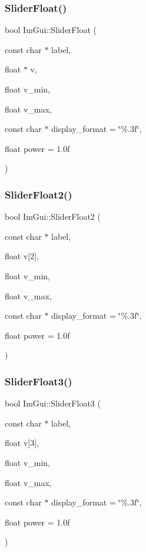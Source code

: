 \subsubsection{\texorpdfstring{Slider\+Float()}{SliderFloat()}}
{\footnotesize\ttfamily bool Im\+Gui\+::\+Slider\+Float (\begin{DoxyParamCaption}\item[{const char $\ast$}]{label,  }\item[{float $\ast$}]{v,  }\item[{float}]{v\+\_\+min,  }\item[{float}]{v\+\_\+max,  }\item[{const char $\ast$}]{display\+\_\+format = {\ttfamily \char`\"{}\%.3f\char`\"{}},  }\item[{float}]{power = {\ttfamily 1.0f} }\end{DoxyParamCaption})}

\hypertarget{namespace_im_gui_a0d5270d08284202523130e8b6ef66350}{}\label{namespace_im_gui_a0d5270d08284202523130e8b6ef66350} 
\subsubsection{\texorpdfstring{Slider\+Float2()}{SliderFloat2()}}
{\footnotesize\ttfamily bool Im\+Gui\+::\+Slider\+Float2 (\begin{DoxyParamCaption}\item[{const char $\ast$}]{label,  }\item[{float}]{v\mbox{[}2\mbox{]},  }\item[{float}]{v\+\_\+min,  }\item[{float}]{v\+\_\+max,  }\item[{const char $\ast$}]{display\+\_\+format = {\ttfamily \char`\"{}\%.3f\char`\"{}},  }\item[{float}]{power = {\ttfamily 1.0f} }\end{DoxyParamCaption})}

\hypertarget{namespace_im_gui_aab33732d7951627f9c32d708f263889f}{}\label{namespace_im_gui_aab33732d7951627f9c32d708f263889f} 
\subsubsection{\texorpdfstring{Slider\+Float3()}{SliderFloat3()}}
{\footnotesize\ttfamily bool Im\+Gui\+::\+Slider\+Float3 (\begin{DoxyParamCaption}\item[{const char $\ast$}]{label,  }\item[{float}]{v\mbox{[}3\mbox{]},  }\item[{float}]{v\+\_\+min,  }\item[{float}]{v\+\_\+max,  }\item[{const char $\ast$}]{display\+\_\+format = {\ttfamily \char`\"{}\%.3f\char`\"{}},  }\item[{float}]{power = {\ttfamily 1.0f} }\end{DoxyParamCaption})}

